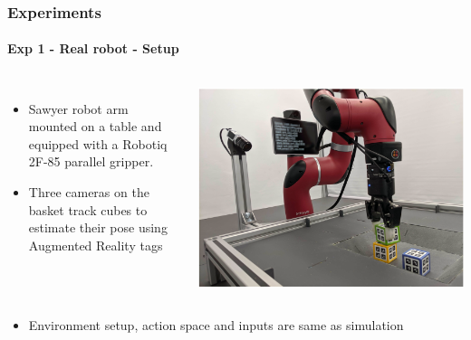 \documentclass{beamer}
\begin{document}
\begin{frame}
	\frametitle{Experiments}
	\framesubtitle{Exp 1 - Real robot  - Setup}
	
	\begin{columns}[c]
		
		
		\begin{itemize}
			\item Sawyer robot arm mounted on a table and equipped with a Robotiq 2F-85 parallel gripper.
			\item Three cameras on the basket track cubes to estimate their pose using Augmented Reality tags
		\end{itemize}
		
		\includegraphics[scale=0.2]{exp1.png}
		
	\end{columns}
	
	\begin{itemize}
		\item Environment setup, action space and inputs are same as simulation
	\end{itemize}
\end{frame}
\end{document}
